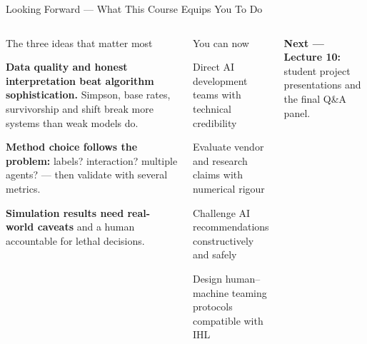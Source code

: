 \documentclass[aspectratio=169,10pt,t]{beamer}
\begin{document}
\begin{frame}{Looking Forward --- What This Course Equips You To Do}
\begin{columns}[T]
\begin{cbox}[AccentCol]{The three ideas that matter most}\scriptsize\begin{te}\item \textbf{Data quality and honest interpretation beat algorithm sophistication.} Simpson, base rates, survivorship and shift break more systems than weak models do.\item \textbf{Method choice follows the problem:} labels? interaction? multiple agents? --- then validate with several metrics.\item \textbf{Simulation results need real-world caveats} and a human accountable for lethal decisions.\end{te}\end{cbox}
\begin{cbox}[ISSAnavy]{You can now}\scriptsize\begin{tl}\item Direct AI development teams with technical credibility\item Evaluate vendor and research claims with numerical rigour\item Challenge AI recommendations constructively and safely\item Design human--machine teaming protocols compatible with IHL\end{tl}\end{cbox}
\begin{rbox}\scriptsize\textbf{Next --- Lecture 10:} student project presentations and the final Q\&A panel.\end{rbox}
\end{columns}
\end{frame}
\end{document}
